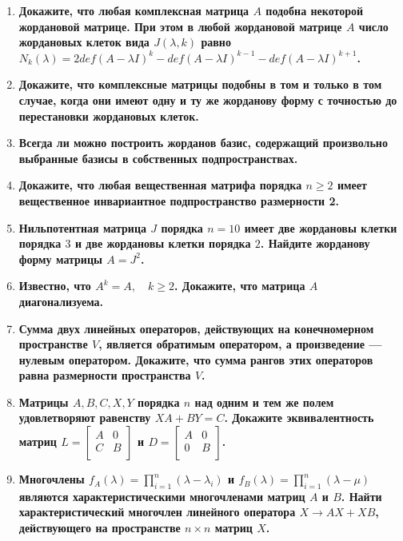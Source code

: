\documentclass[12pt]{article} %
\begin{document}
\begin{enumerate}
    \item \textbf{Докажите, что любая комплексная матрица $A$ подобна некоторой жордановой матрице. При этом в любой жордановой матрице $A$ число жордановых клеток вида $J(\lambda, k)$ равно $N_k(\lambda) = 2def(A - \lambda I)^k - def(A - \lambda I)^{k - 1} - def(A - \lambda I)^{k + 1}$.}
    \item \textbf{Докажите, что комплексные матрицы подобны в том и только в том случае, когда они имеют одну и ту же жорданову форму с точностью до  перестановки жордановых клеток.}
    \item \textbf{Всегда ли можно построить жорданов базис, содержащий произвольно выбранные базисы в собственных подпространствах.}
    \item \textbf{Докажите, что любая вещественная матрифа порядка $n \geqslant 2$ имеет вещественное инвариантное подпространство размерности 2.}
    \item \textbf{Нильпотентная матрица $J$ порядка $n = 10$ имеет две жордановы клетки порядка $3$ и две жордановы клетки порядка $2$. Найдите жорданову форму матрицы $A = J^2$.}
    \item \textbf{Известно, что $A^k = A, \quad k \geqslant 2$. Докажите, что матрица $A$ диагонализуема.}
    \item \textbf{Сумма двух линейных операторов, действующих на конечномерном пространстве $V$, является обратимым оператором, а произведение --- нулевым оператором. Докажите, что сумма рангов этих операторов равна размерности пространства $V$.}
    \item \textbf{Матрицы $A, B, C, X, Y$ порядка $n$ над одним и тем же полем удовлетворяют равенству $XA + BY = C$. Докажите эквивалентность матриц $L = 
    \begin{bmatrix}
        A & 0\\
        C & B\\
    \end{bmatrix}
    $ и $D = 
    \begin{bmatrix}
        A & 0\\
        0 & B\\
    \end{bmatrix}
    $.}
    \item \textbf{Многочлены $f_A(\lambda) = \prod_{i=1}^{n}(\lambda - \lambda_i)$ и $f_B(\lambda) = \prod_{i=1}^{n}(\lambda - \mu)$ являются характеристическими многочленами матриц $A$ и $B$. Найти характеристический многочлен линейного оператора $X \rightarrow AX + XB$, действующего на пространстве $n \times n$ матриц $X$.}

\end{enumerate}
\end{document}
